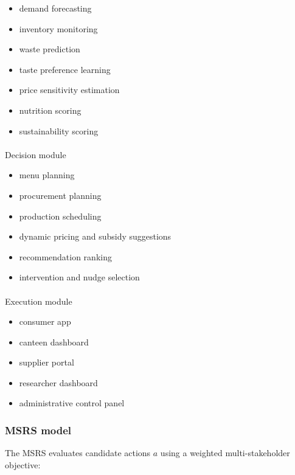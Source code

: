 \documentclass[
  letterpaper,
  DIV=11,
  numbers=noendperiod]{scrartcl}
\makeatletter
\let\oldparagraph\paragraph
\renewcommand{\paragraph}{
    \@ifstar
      \xxxParagraphStar
      \xxxParagraphNoStar
  }
\newcommand{\xxxParagraphStar}[1]{\oldparagraph*{#1}\mbox{}}
\newcommand{\xxxParagraphNoStar}[1]{\oldparagraph{#1}\mbox{}}
\providecommand{\tightlist}{%
  \setlength{\itemsep}{0pt}\setlength{\parskip}{0pt}}
\makeatother
\begin{document}
\begin{itemize}
\tightlist
\item
  demand forecasting
\item
  inventory monitoring
\item
  waste prediction
\item
  taste preference learning
\item
  price sensitivity estimation
\item
  nutrition scoring
\item
  sustainability scoring
\end{itemize}

\paragraph{Decision module}\label{decision-module}

\begin{itemize}
\tightlist
\item
  menu planning
\item
  procurement planning
\item
  production scheduling
\item
  dynamic pricing and subsidy suggestions
\item
  recommendation ranking
\item
  intervention and nudge selection
\end{itemize}

\paragraph{Execution module}\label{execution-module}

\begin{itemize}
\tightlist
\item
  consumer app
\item
  canteen dashboard
\item
  supplier portal
\item
  researcher dashboard
\item
  administrative control panel
\end{itemize}

\subsubsection{MSRS model}\label{msrs-model}

The MSRS evaluates candidate actions \(a\) using a weighted
multi-stakeholder objective:
\end{document}
